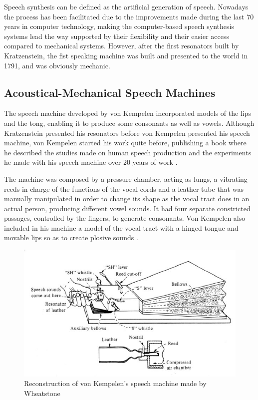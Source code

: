 Speech synthesis can be defined as the artificial generation of speech. Nowadays the process has been facilitated due to the improvements made during the last 70 years in computer technology, making the computer-based speech synthesis systems lead the way supported by their flexibility and their easier access compared to mechanical systems. However, after the first resonators built by Kratzenstein, the fist speaking machine was built and presented to the world in 1791, and was obviously mechanic.

\subsection{Acoustical-Mechanical Speech Machines}
\label{history_mechanical_machines}
The speech machine developed by von Kempelen incorporated models of the lips and the tong, enabling it to produce some consonants as well as vowels. Although Kratzenstein presented his resonators before von Kempelen presented his speech machine, von Kempelen started his work quite before, publishing a book where he described the studies made on human speech production and the experiments he made with his speech machine over 20 years of work \cite{vonKempelen}.  

The machine was composed by a pressure chamber, acting as lungs, a vibrating reeds in charge of the functions of the vocal cords and a leather tube that was manually manipulated in order to change its shape as the vocal tract does in an actual person, producing different vowel sounds. It had four separate constricted passages, controlled by the fingers, to generate consonants. Von Kempelen also included in his machine a model of the vocal tract with a hinged tongue and movable lips so as to create plosive sounds \cite{Schroeder93, LemmettyMSc, flanagan_1973_speech}. 

\begin{figure}[htb]
	\begin{center}
		\includegraphics[width=\textwidth]{images/von_kempelen_machine.jpg}
		\caption{Reconstruction of von Kempelen's speech machine made by Wheatstone \cite{flanagan_book}}
		\label{fig:speech_machine}
	\end{center}
\end{figure}

